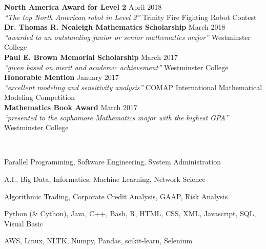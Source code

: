 \documentclass[letterpaper,11pt]{article}
\newcommand{\resheading}[1]{{\vspace{2pt}\large \colorbox{electricpurple}{\begin{minipage}{\textwidth}{\textbf{#1 \vphantom{p\^{E}}}}\end{minipage}}}\vspace{3pt}}
\newcommand{\Award}[4]{
	\textbf{#1} \hfill #2 \\
	\textit{``#3''} \hfill #4 \\
}
\begin{document}
		\Award{North America Award for Level 2}{April 2018}{The top North American robot in Level 2}{Trinity Fire Fighting Robot Contest}

		\Award{Dr. Thomas R. Nealeigh Mathematics Scholarship}{March 2018}{awarded to an outstanding junior or senior mathematics major}{Westminster College}

		\Award{Paul E. Brown Memorial Scholarship}{March 2017}{given based on merit and academic achievement}{Westminster College}

		\Award{Honorable Mention}{January 2017}{excellent modeling and sensitivity analysis}{COMAP International Mathematical Modeling Competition}

		\Award{Mathematics Book Award}{March 2017}{presented to the sophomore Mathematics major with the highest GPA}{Westminster College}
	
	\resheading{\textcolor{white}{\ \faCheckSquare \ Skills}}
	\vspace{-16pt}
	\begin{description}[itemsep=1pt]
		\item[\faServer \ Computer Science:]  Parallel Programming,  Software Engineering, System Administration
		\item[\faChartLine \ Data Science:] A.I., Big Data, Informatics, Machine Learning, Network Science
		\item[\faDollarSign \ Finance and Economics:] Algorithmic Trading, Corporate Credit Analysis, GAAP, Risk Analysis
		\item[\faCode \ Languages:] Python (\& Cython), Java, C++, Bash, R, HTML, CSS, XML, Javascript, SQL, Visual Basic
		\item[\faFileCode \ Software \& Tools:] AWS, Linux, NLTK, Numpy, Pandas, scikit-learn, Selenium
	\end{description}
	
\end{document}
